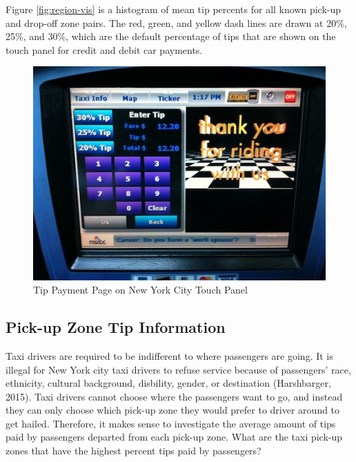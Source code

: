 \documentclass[12pt,twoside]{reedthesis}
\theoremstyle{definition}
\theoremstyle{definition}
\theoremstyle{definition}
\theoremstyle{remark}
\begin{document}
Figure \ref{fig:region-vis} is a histogram of mean tip percents for all
known pick-up and drop-off zone pairs. The red, green, and yellow dash
lines are drawn at 20\%, 25\%, and 30\%, which are the default
percentage of tips that are shown on the touch panel for credit and
debit car payments.
\begin{figure}

{\centering \includegraphics[width=4.8in]{figure/taxi-screen} 

}

\caption{Tip Payment Page on New York City Touch Panel}\label{fig:taxi-screen}
\end{figure}
\subsection{Pick-up Zone Tip
Information}\label{pick-up-zone-tip-information}

Taxi drivers are required to be indifferent to where passengers are
going. It is illegal for New York city taxi drivers to refuse service
because of passengers' race, ethnicity, cultural background, disbility,
gender, or destination (Harshbarger, 2015). Taxi drivers cannot choose
where the passengers want to go, and instead they can only choose which
pick-up zone they would prefer to driver around to get hailed.
Therefore, it makes sense to investigate the average amount of tips paid
by passengers departed from each pick-up zone. What are the taxi pick-up
zones that have the highest percent tips paid by passengers?
\end{document}
